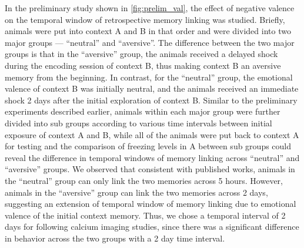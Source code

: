 \documentclass[master.tex]{subfiles}
\begin{document}
In the preliminary study shown in \autoref{fig:prelim_val}, the effect of
negative valence on the temporal window of retrospective memory linking was
studied. Briefly, animals were put into context A and B in that order and were
divided into two major groups --- ``neutral'' and ``aversive''. The difference
between the two major groups is that in the ``aversive'' group, the animals
received a delayed shock during the encoding session of context B, thus making
context B an aversive memory from the beginning. In contrast, for the
``neutral'' group, the emotional valence of context B was initially neutral, and
the animals received an immediate shock 2 days after the initial exploration of
context B. Similar to the preliminary experiments described earlier, animals
within each major group were further divided into sub groups according to various
time intervals between initial exposure of context A and B, while all of the
animals were put back to context A for testing and the comparison of freezing
levels in A between sub groups could reveal the difference in temporal windows
of memory linking across ``neutral'' and ``aversive'' groups. We observed that
consistent with published works, animals in the ``neutral'' group can only link
the two memories across 5 hours. However, animals in the ``aversive'' group can
link the two memories across 2 days, suggesting an extension of temporal window
of memory linking due to emotional valence of the initial context memory. Thus,
we chose a temporal interval of 2 days for following calcium imaging studies,
since there was a significant difference in behavior across the two groups with a
2 day time interval.
\end{document}
